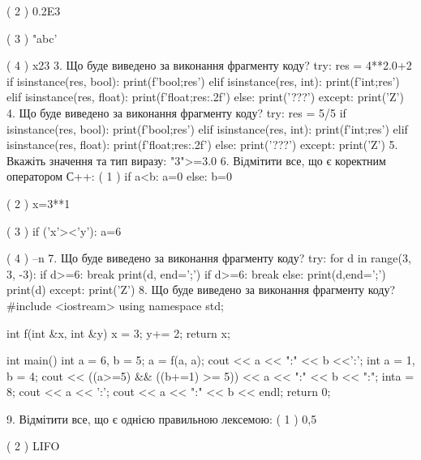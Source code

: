 \documentclass[11pt]{article}
\begin{document}
( 2 ) 0.2E3

( 3 ) "abc'

( 4 ) x23
\vspace{5mm}
3. Що буде виведено за виконання фрагменту коду?
try:
    res = 4**2.0+2
    if isinstance(res, bool):
        print(f'bool;{res}')
    elif isinstance(res, int):
        print(f'int;{res}')
    elif isinstance(res, float):
        print(f'float;{res:.2f}')
    else:
        print('???')
except:
    print('Z')
\vspace{5mm}
4. Що буде виведено за виконання фрагменту коду?
try:
    res = 5/5%
    if isinstance(res, bool):
        print(f'bool;{res}')
    elif isinstance(res, int):
        print(f'int;{res}')
    elif isinstance(res, float):
        print(f'float;{res:.2f}')
    else:
        print('???')
except:
    print('Z')
\vspace{5mm}
5. 
Вкажіть значення та тип виразу:
"3">=3.0
\vspace{5mm}
6. %
Відмітити все, що є коректним оператором С++:
( 1 ) if a<b: a=0 else: b=0

( 2 ) x=3**1

( 3 ) if ('x'><'y'): a=6

( 4 ) --n
\vspace{5mm}
7. Що буде виведено за виконання фрагменту коду?
try:
    for d in range(3, 3, -3):
        if d>=6:
            break
        print(d, end=';')
        if d>=6:
            break
    else:
        print(d,end=';')
    print(d)
except:
    print('Z')
\vspace{5mm}
8. Що буде виведено за виконання фрагменту коду?
#include <iostream>
using namespace std;

int f(int &x, int &y){
    x = 3;
    y+= 2;
    return x;
}

int main(){
    int a = 6, b = 5;
    a = f(a, a);
    cout << a << ":" << b <<':';
    {
        int a = 1, b = 4;
        cout << ((a>=5) && ((b+=1) >= 5))
             << a << ":" << b << ":";
    }
    {
        inta = 8;
        cout << a << ':';
    }
    cout << a << ":" << b << endl;
    return 0;
}

\vspace{5mm}
9. %
Відмітити все, що є однією правильною лексемою:
( 1 ) 0,5

( 2 ) LIFO
\end{document}
